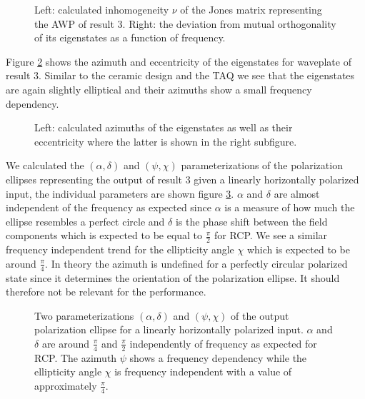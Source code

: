 \begin{figure}[H]
    \centering
    
    \caption{Left: calculated inhomogeneity $\nu$ of the Jones matrix representing the AWP of result 3. Right: the deviation from mutual orthogonality of its eigenstates as a function of frequency.}
    \label{fig:inhomogeneity_orthogonality}
\end{figure}

Figure \ref{fig:polymer_eigenstate_params} shows the azimuth and eccentricity of the eigenstates for waveplate of result 3. Similar to the ceramic design and the TAQ we see that the eigenstates are again slightly elliptical and their azimuths show a small frequency dependency.

\begin{figure}[H]
    \centering
    
    \caption{Left: calculated azimuths of the eigenstates as well as their eccentricity where the latter is shown in the right subfigure.}
    \label{fig:polymer_eigenstate_params}
\end{figure}

We calculated the $(\alpha, \delta)$ and $(\psi, \chi)$ parameterizations of the polarization ellipses representing the output of result 3 given a linearly horizontally polarized input, the individual parameters are shown figure \ref{fig:polymer_params_dotted}. $\alpha$ and $\delta$ are almost independent of the frequency as expected since $\alpha$ is a measure of how much the ellipse resembles a perfect circle and $\delta$ is the phase shift between the field components which is expected to be equal to $\frac{\pi}{2}$ for RCP. We see a similar frequency independent trend for the ellipticity angle $\chi$ which is expected to be around $\frac{\pi}{4}$. In theory the azimuth is undefined for a perfectly circular polarized state since it determines the orientation of the polarization ellipse. It should therefore not be relevant for the performance.

\begin{figure}[H]
    \centering
    
    \caption{Two parameterizations $(\alpha, \delta)$ and $(\psi, \chi)$ of the output polarization ellipse for a linearly horizontally polarized input. $\alpha$ and $\delta$ are around $\frac{\pi}{4}$ and $\frac{\pi}{2}$ independently of frequency as expected for RCP. The azimuth $\psi$ shows a frequency dependency while the ellipticity angle $\chi$ is frequency independent with a value of approximately $\frac{\pi}{4}$.}
    \label{fig:polymer_params_dotted}
\end{figure}



